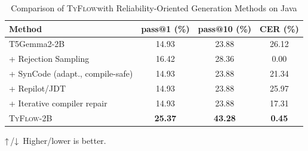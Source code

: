 \documentclass[manuscript,screen]{acmart}
\newcommand{\updir}{\textcolor{black}{↑}}  %
\newcommand{\downdir}{\textcolor{black}{↓}}
\newcommand{\toolname}[1]{\textsc{#1}}
\newcommand{\mainname}{\toolname{TyFlow}\xspace}
\begin{document}
 \begin{table}[ht]
\centering
\begin{threeparttable}
\caption{Comparison    {\color{revblue}of } \mainname  {\color{revblue}with Reliability-Oriented Generation Methods on Java} }
\label{tab:model-compare-sufu-java}
  \begin{tabular}{
    l
    c
    c
    c
}
 \toprule
   {\color{revblue}Method } &  %
 {pass@1 (\%)\tnote{\updir}} & {pass@10 (\%)\tnote{\updir}}  & {{\color{revblue}CER (\%)}\tnote{\downdir}}  \\
\midrule
  {\color{revblue}T5Gemma2-2B           } &    {\color{revblue}14.93 } &    {\color{revblue}23.88 } &    {\color{revblue}26.12 } \\
  {\color{revblue}\quad } + Rejection Sampling &    {\color{revblue}16.42 } &    {\color{revblue}28.36 }& {\color{revblue}0.00 } \\
 {\color{revblue}\quad + SynCode (adapt., compile-safe) } &  %
  {\color{revblue}14.93 } &  \textbf{} %
  {\color{revblue}23.88 } &  \textbf{} %
  {\color{revblue}21.34 } \\
  {\color{revblue}\quad + Repilot/JDT       } &    {\color{revblue}14.93 } &    {\color{revblue}23.88 } &    {\color{revblue}25.97 } \\
  {\color{revblue}\quad } +    {\color{revblue}Iterative compiler repair } &    {\color{revblue}14.93 } &  %
  {\color{revblue}23.88 } &  {\color{revblue}17.31 }\\
 \mainname   {\color{revblue}-2B          } & \textbf{\color{revblue}25.37} & \textbf{\color{revblue}43.28}  & \textbf{\color{revblue}0.45}  \\
\bottomrule
\end{tabular}
 \begin{tablenotes}
\footnotesize
\item {\color{revblue}\updir\,/\downdir\, Higher/lower is better.
}\end{tablenotes}
 \end{threeparttable}
\end{table}
\end{document}
